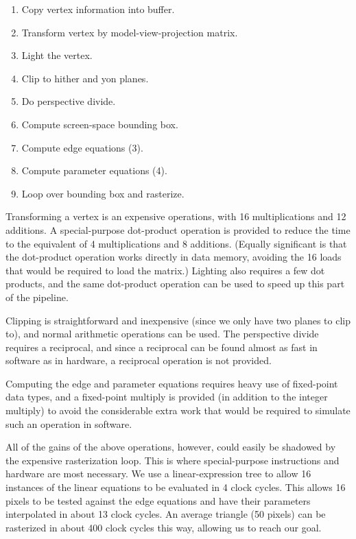 \documentclass{book}
\begin{document}
\begin{enumerate}
\item Copy vertex information into buffer.
\item Transform vertex by model-view-projection matrix.
\item Light the vertex.
\item Clip to hither and yon planes.
\item Do perspective divide.
\item Compute screen-space bounding box.
\item Compute edge equations (3).
\item Compute parameter equations (4).
\item Loop over bounding box and rasterize.
\end{enumerate}

Transforming a vertex is an expensive operations, with 16 multiplications
and 12 additions.  A special-purpose dot-product operation is provided
to reduce the time to the equivalent of 4 multiplications and 8 additions.
(Equally significant is that the dot-product operation works directly in
data memory, avoiding the 16 loads that would be required to load the
matrix.)
Lighting also requires a few dot products, and the same dot-product
operation can be used to speed up this part of the pipeline.

Clipping is straightforward and inexpensive (since we only have two
planes to clip to), and normal arithmetic operations can be used.
The perspective divide requires a reciprocal, and since a reciprocal
can be found almost as fast in software as in hardware, a reciprocal
operation is not provided.

Computing the edge and parameter equations requires heavy use of
fixed-point data types, and a fixed-point multiply is provided (in
addition to the integer multiply) to avoid the considerable extra
work that would be required to simulate such an operation in
software.

All of the gains of the above operations, however, could easily be
shadowed by the expensive rasterization loop.  This is where
special-purpose instructions and hardware are most necessary.  We use
a linear-expression tree to allow 16 instances of the linear equations
to be evaluated in 4 clock cycles.  This allows 16 pixels to be tested
against the edge equations and have their parameters interpolated in
about 13 clock cycles.  An average triangle (50 pixels) can be
rasterized in about 400 clock cycles this way, allowing us to reach
our goal.
\end{document}
